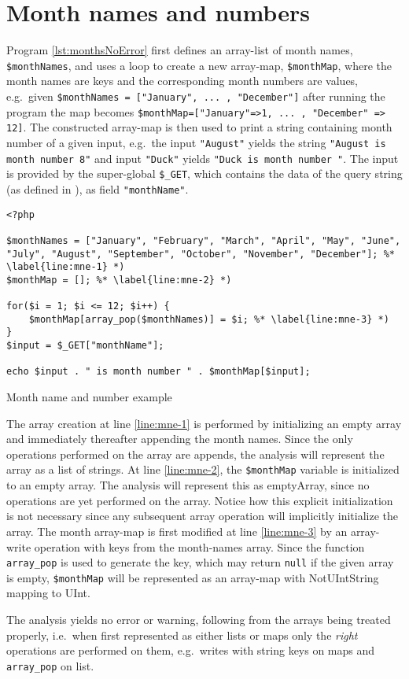 \section{Month names and numbers}
\label{sec:monthnamenumber}

Program \ref{lst:monthsNoError} first defines an array-list of month names, \texttt{\$monthNames}, and uses a loop to create a new array-map, \texttt{\$monthMap}, where the month names are keys and the corresponding month numbers are values, e.g.\ given \texttt{\$monthNames = ["January", ... , "December"]} after running the program the map becomes \texttt{\$monthMap=["January"=>1, ... , "December" => 12]}. The constructed array-map is then used to print a string containing month number of a given input, e.g.\ the input \texttt{"August"} yields the string \texttt{"August is month number 8"} and input \texttt{"Duck"} yields \texttt{"Duck is month number "}. The input is provided by the super-global \texttt{\$\_GET}, which contains the data of the query string (as defined in ), as field \texttt{"monthName"}. 


\begin{program}
\begin{lstlisting}
<?php

$monthNames = ["January", "February", "March", "April", "May", "June", "July", "August", "September", "October", "November", "December"]; %* \label{line:mne-1} *)
$monthMap = []; %* \label{line:mne-2} *)

for($i = 1; $i <= 12; $i++) {
	$monthMap[array_pop($monthNames)] = $i; %* \label{line:mne-3} *)
}
$input = $_GET["monthName"];

echo $input . " is month number " . $monthMap[$input];
\end{lstlisting}
\caption{Month name and number example}
\label{lst:monthsNoError}
\end{program}

The array creation at line \ref{line:mne-1} is performed by initializing an empty array and immediately thereafter appending the month names. Since the only operations performed on the array are appends, the analysis will represent the array as a list of strings. At line \ref{line:mne-2}, the \texttt{\$monthMap} variable is initialized to an empty array. The analysis will represent this as emptyArray, since no operations are yet performed on the array. Notice how this explicit initialization is not necessary since any subsequent array operation will implicitly initialize the array. The month array-map is first modified at line \ref{line:mne-3} by an array-write operation with keys from the month-names array. Since the function \texttt{array\_pop} is used to generate the key, which may return \texttt{null} if the given array is empty, \texttt{\$monthMap} will be represented as an array-map with NotUIntString mapping to UInt. 

The analysis yields no error or warning, following from the arrays being treated properly, i.e.\ when first represented as either lists or maps only the \emph{right} operations are performed on them, e.g.\ writes with string keys on maps and \texttt{array\_pop} on list.  
